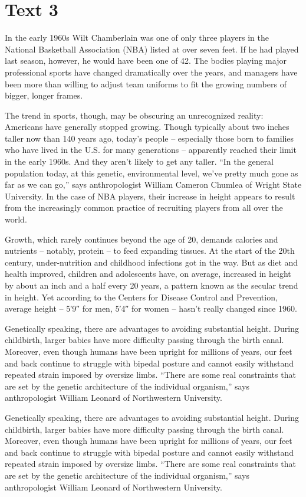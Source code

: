 \documentclass[a4paper]{ctexart}
\begin{document}
\section{Text 3}
In the early 1960s Wilt Chamberlain was one of only three players in the National Basketball Association (NBA) listed at over seven feet. If he had played last season, however, he would have been one of 42. The bodies playing major professional sports have changed dramatically over the years, and managers have been more than willing to adjust team uniforms to fit the growing numbers of bigger, longer frames.
\par
The trend in sports, though, may be obscuring an unrecognized reality: Americans have generally stopped growing. Though typically about two inches taller now than 140 years ago, today’s people – especially those born to families who have lived in the U.S. for many generations – apparently reached their limit in the early 1960s. And they aren’t likely to get any taller. “In the general population today, at this genetic, environmental level, we’ve pretty much gone as far as we can go,” says anthropologist William Cameron Chumlea of Wright State University. In the case of NBA players, their increase in height appears to result from the increasingly common practice of recruiting players from all over the world.
\par
Growth, which rarely continues beyond the age of 20, demands calories and nutrients – notably, protein – to feed expanding tissues. At the start of the 20th century, under-nutrition and childhood infections got in the way. But as diet and health improved, children and adolescents have, on average, increased in height by about an inch and a half every 20 years, a pattern known as the secular trend in height. Yet according to the Centers for Disease Control and Prevention, average height – 5′9″ for men, 5′4″ for women – hasn’t really changed since 1960.
\par
Genetically speaking, there are advantages to avoiding substantial height. During childbirth, larger babies have more difficulty passing through the birth canal. Moreover, even though humans have been upright for millions of years, our feet and back continue to struggle with bipedal posture and cannot easily withstand repeated strain imposed by oversize limbs. “There are some real constraints that are set by the genetic architecture of the individual organism,” says anthropologist William Leonard of Northwestern University.
\par
Genetically speaking, there are advantages to avoiding substantial height. During childbirth, larger babies have more difficulty passing through the birth canal. Moreover, even though humans have been upright for millions of years, our feet and back continue to struggle with bipedal posture and cannot easily withstand repeated strain imposed by oversize limbs. “There are some real constraints that are set by the genetic architecture of the individual organism,” says anthropologist William Leonard of Northwestern University.
\end{document}

